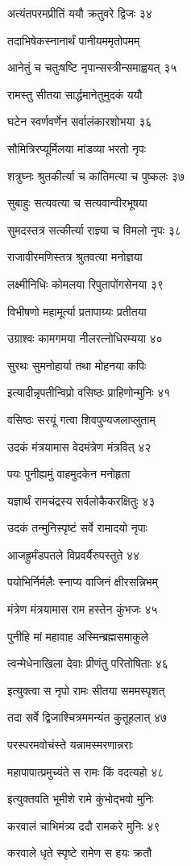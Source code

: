अत्यंतपरमप्रीतिं ययौ क्रतुवरे द्विजः ३४

तदाभिषेकस्नानार्थं पानीयममृतोपमम्

आनेतुं च चतुःषष्टि नृपान्सस्त्रीन्समाह्वयत् ३५

रामस्तु सीतया सार्द्धमानेतुमुदकं ययौ

घटेन स्वर्णवर्णेन सर्वालंकारशोभया ३६

सौमित्रिरप्यूर्मिलया मांडव्या भरतो नृपः

शत्रुघ्नः श्रुतकीर्त्या च कांतिमत्या च पुष्कलः ३७

सुबाहुः सत्यवत्या च सत्यवान्वीरभूषया

सुमदस्तत्र सत्कीर्त्या राज्ञ्या च विमलो नृपः ३८

राजावीरमणिस्तत्र श्रुतवत्या मनोज्ञया

लक्ष्मीनिधिः कोमलया रिपुतापोंगसेनया ३९

विभीषणो महामूर्त्या प्रतापाग्र्यः प्रतीतया

उग्राश्वः कामगमया नीलरत्नोधिरम्यया ४०

सुरथः सुमनोहार्या तथा मोहनया कपिः

इत्यादीन्नृपतीन्विप्रो वसिष्ठः प्राहिणोन्मुनिः ४१

वसिष्ठः सरयूं गत्वा शिवपुण्यजलाप्लुताम्

उदकं मंत्रयामास वेदमंत्रेण मंत्रवित् ४२

पयः पुनीह्यमुं वाहमुदकेन मनोहृता

यज्ञार्थं रामचंद्रस्य सर्वलोकैकरक्षितुः ४३

उदकं तन्मुनिस्पृष्टं सर्वे रामादयो नृपाः

आजह्रुर्मंडपतले विप्रवर्यैरुपस्तुते ४४

पयोभिर्निर्मलैः स्नाप्य वाजिनं क्षीरसन्निभम्

मंत्रेण मंत्रयामास राम हस्तेन कुंभजः ४५

पुनीहि मां महावाह अस्मिन्ब्रह्मसमाकुले

त्वन्मेधेनाखिला देवाः प्रीणंतु परितोषिताः ४६

इत्युक्त्वा स नृपो रामः सीतया सममस्पृशत्

तदा सर्वे द्विजाश्चित्रममन्यंत कुतूहलात् ४७

परस्परमवोचंस्ते यन्नामस्मरणान्नराः

महापापात्प्रमुच्यंते स रामः किं वदत्यहो ४८

इत्युक्तवति भूमीशे रामे कुंभोद्भवो मुनिः

करवालं चाभिमंत्र्य ददौ रामकरे मुनिः ४९

करवाले धृते स्पृष्टे रामेण स हयः क्रतौ

